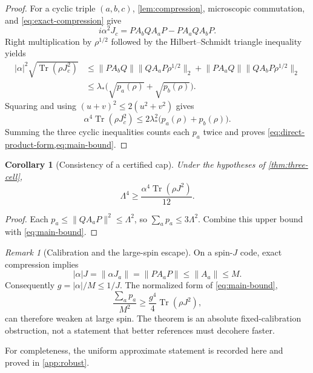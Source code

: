 \documentclass[11pt]{article}
\newtheorem{corollary}[theorem]{Corollary}
\theoremstyle{remark}
\newtheorem{remark}[theorem]{Remark}
\newcommand{\1}{\mathbf 1}
\newcommand{\Tr}{\operatorname{Tr}}
\begin{document}
\begin{proof}
For a cyclic triple $(a,b,c)$, \cref{lem:compression}, microscopic
commutation, and \cref{eq:exact-compression} give
\begin{equation}
  i\alpha^2J_c=P A_bQ A_aP-P A_aQ A_bP.
  \label{eq:cyclic-factorization}
\end{equation}
Right multiplication by $\rho^{1/2}$ followed by the Hilbert--Schmidt
triangle inequality yields
\begin{align*}
  |\alpha|^2\sqrt{\Tr(\rho J_c^2)}
  &\leq \lVert P A_bQ\rVert
          \lVert Q A_aP\rho^{1/2}\rVert_2
       + \lVert P A_aQ\rVert
          \lVert Q A_bP\rho^{1/2}\rVert_2 \\
  &\leq \lambda_*\bigl(\sqrt{p_a(\rho)}+\sqrt{p_b(\rho)}\bigr).
\end{align*}
Squaring and using $(u+v)^2\leq2(u^2+v^2)$ gives
\[
  \alpha^4\Tr(\rho J_c^2)
  \leq2\lambda_*^2\bigl(p_a(\rho)+p_b(\rho)\bigr).
\]
Summing the three cyclic inequalities counts each $p_a$ twice and proves
\cref{eq:direct-product-form,eq:main-bound}.
\end{proof}

\begin{corollary}[Consistency of a certified cap]
\label{cor:cap-consistency}
Under the hypotheses of \cref{thm:three-cell},
\begin{equation}
  \Lambda^4\geq\frac{\alpha^4\Tr(\rho J^2)}{12}.
  \label{eq:cap-consistency}
\end{equation}
\end{corollary}

\begin{proof}
Each $p_a\leq\lVert Q A_aP\rVert^2\leq\Lambda^2$, so
$\sum_a p_a\leq3\Lambda^2$. Combine this upper bound with
\cref{eq:main-bound}.
\end{proof}

\begin{remark}[Calibration and the large-spin escape]
\label{rem:calibration}
On a spin-$J$ code, exact compression implies
\[
  |\alpha|J=\lVert\alpha J_a\rVert
  =\lVert P A_aP\rVert\leq\lVert A_a\rVert\leq M.
\]
Consequently $g=|\alpha|/M\leq1/J$. The normalized form of
\cref{eq:main-bound},
\[
  \frac{\sum_a p_a}{M^2}
  \geq \frac{g^4}{4}\Tr(\rho J^2),
\]
can therefore weaken at large spin. The theorem is an absolute
fixed-calibration obstruction, not a statement that better references must
decohere faster.
\end{remark}

For completeness, the uniform approximate statement is recorded here and
proved in \cref{app:robust}.
\end{document}
